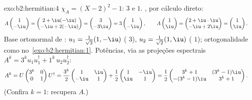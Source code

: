 \begin{solution}{exo:b2:hermitian:4}
$\chi_A = (X-2)^2 - 1$:  $3$ e $1$. , por
cálculo direto:
\[
A\begin{pmatrix}1\\ -\iu\end{pmatrix}
= \begin{pmatrix} 2 + \iu(-\iu)\\ -\iu + 2(-\iu)\end{pmatrix}
= \begin{pmatrix} 3\\ -3\iu \end{pmatrix}
= 3\begin{pmatrix}1\\ -\iu\end{pmatrix},
\qquad
A\begin{pmatrix}1\\ \iu\end{pmatrix}
= \begin{pmatrix} 2 + \iu\cdot\iu\\ -\iu + 2\iu\end{pmatrix}
= \begin{pmatrix}1\\ \iu\end{pmatrix}.
\]
Base ortonormal de : $u_1 = \frac{1}{\sqrt2}(1, -\iu)$
( $3$), $u_2 = \frac{1}{\sqrt2}(1, \iu)$ (
$1$); ortogonalidade como no~\cref{exo:b2:hermitian:1}. Potências, via
as projeções espectrais $A^k = 3^k u_1u_1^\dagger + 1^k\,
u_2u_2^\dagger$:
\[
A^k = U\begin{pmatrix} 3^k & 0\\ 0 & 1\end{pmatrix}U^\dagger
= \frac{3^k}{2}\begin{pmatrix} 1 & \iu\\ -\iu & 1\end{pmatrix}
+ \frac{1}{2}\begin{pmatrix} 1 & -\iu\\ \iu & 1\end{pmatrix}
= \frac12\begin{pmatrix}
3^k + 1 & (3^k - 1)\iu\\
-(3^k-1)\iu & 3^k + 1
\end{pmatrix}.
\]
(Confira $k = 1$: recupera $A$.)
\end{solution}

